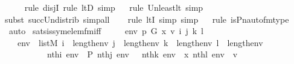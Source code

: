 \begin{isabellebody}
\ \ \ \ \isamarkupfalse%
{\isacharparenleft}{\kern0pt}rule\ disjI{}{\isacharcomma}{\kern0pt}\ rule\ ltD{\isacharcomma}{\kern0pt}\ simp{\isacharparenright}{\kern0pt}\isanewline
\ \ \isamarkupfalse%
{\isacharparenleft}{\kern0pt}rule\ Un{\isacharunderscore}{\kern0pt}least{\isacharunderscore}{\kern0pt}lt{\isacharcomma}{\kern0pt}\ simp{\isacharparenright}{\kern0pt}\isanewline
\ \ \ \isamarkupfalse%
{\isacharparenleft}{\kern0pt}subst\ succ{\isacharunderscore}{\kern0pt}Un{\isacharunderscore}{\kern0pt}distrib{\isacharcomma}{\kern0pt}\ simp{\isacharunderscore}{\kern0pt}all{\isacharparenright}{\kern0pt}{\isacharplus}{\kern0pt}\isanewline
\ \ \ \isamarkupfalse%
{\isacharparenleft}{\kern0pt}rule\ ltI{\isacharcomma}{\kern0pt}\ simp{\isacharcomma}{\kern0pt}\ simp{\isacharparenright}{\kern0pt}\isanewline
\ \ \isamarkupfalse%
{\isacharparenleft}{\kern0pt}rule\ is{\isacharunderscore}{\kern0pt}Pn{\isacharunderscore}{\kern0pt}auto{\isacharunderscore}{\kern0pt}fm{\isacharunderscore}{\kern0pt}type{\isacharparenright}{\kern0pt}\isanewline
\ \ \isamarkupfalse%
\ auto%
\endisatagproof
{\isafoldproof}%
%
\isadelimproof
\isanewline
%
\endisadelimproof
\isanewline
{}\isamarkupfalse%
\ sats{\isacharunderscore}{\kern0pt}is{\isacharunderscore}{\kern0pt}sym{\isacharunderscore}{\kern0pt}elem{\isacharunderscore}{\kern0pt}fm{\isacharunderscore}{\kern0pt}iff\ {\isacharcolon}{\kern0pt}\ \isanewline
\ \ \ env\ p\ G\ x\ v\ i\ j\ k\ l\ \isanewline
\ \ \ {\isachardoublequoteopen}env\ {\isasymin}\ list{\isacharparenleft}{\kern0pt}M{\isacharparenright}{\kern0pt}{\isachardoublequoteclose}\ {\isachardoublequoteopen}i\ {\isacharless}{\kern0pt}\ length{\isacharparenleft}{\kern0pt}env{\isacharparenright}{\kern0pt}{\isachardoublequoteclose}\ {\isachardoublequoteopen}j\ {\isacharless}{\kern0pt}\ length{\isacharparenleft}{\kern0pt}env{\isacharparenright}{\kern0pt}{\isachardoublequoteclose}\ {\isachardoublequoteopen}k\ {\isacharless}{\kern0pt}\ length{\isacharparenleft}{\kern0pt}env{\isacharparenright}{\kern0pt}{\isachardoublequoteclose}\ {\isachardoublequoteopen}l\ {\isacharless}{\kern0pt}\ length{\isacharparenleft}{\kern0pt}env{\isacharparenright}{\kern0pt}{\isachardoublequoteclose}\isanewline
\ \ \ \ \ \ \ \ \ \ {\isachardoublequoteopen}nth{\isacharparenleft}{\kern0pt}i{\isacharcomma}{\kern0pt}\ env{\isacharparenright}{\kern0pt}\ {\isacharequal}{\kern0pt}\ P{\isachardoublequoteclose}\ {\isachardoublequoteopen}nth{\isacharparenleft}{\kern0pt}j{\isacharcomma}{\kern0pt}\ env{\isacharparenright}{\kern0pt}\ {\isacharequal}{\kern0pt}\ {\isasymG}{\isachardoublequoteclose}\ {\isachardoublequoteopen}nth{\isacharparenleft}{\kern0pt}k{\isacharcomma}{\kern0pt}\ env{\isacharparenright}{\kern0pt}\ {\isacharequal}{\kern0pt}\ x{\isachardoublequoteclose}\ {\isachardoublequoteopen}nth{\isacharparenleft}{\kern0pt}l{\isacharcomma}{\kern0pt}\ env{\isacharparenright}{\kern0pt}\ {\isacharequal}{\kern0pt}\ v{\isachardoublequoteclose}\ \isanewline

\end{isabellebody}
